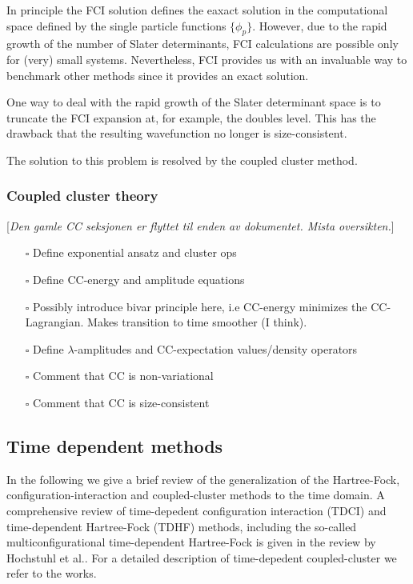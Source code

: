 \documentclass[aip,jcp,reprint,floatfix]{revtex4-1}
\newcommand \mycomment[1]   {{\color{red} [{\it {#1}}]}}
\newcommand{\todo}{$\square$}
\begin{document}
    In principle the FCI solution defines the eaxact solution in the computational space defined by the single particle functions $\{\phi_p \}$. However, due to the rapid growth of the number of Slater determinants, FCI calculations are possible only for (very) small systems. Nevertheless, FCI provides us with an invaluable way to benchmark other methods since it provides an exact solution.
    
    One way to deal with the rapid growth of the Slater determinant space is to truncate the FCI expansion at, for example, the doubles level. This has the drawback that the resulting wavefunction no longer is size-consistent\cite{shavitt2009many}.
    
    The solution to this problem is resolved by the coupled cluster method.
    
    \subsubsection{Coupled cluster theory}
    \mycomment{Den gamle CC seksjonen er flyttet til enden av dokumentet. Mista oversikten.}
    \begin{itemize}
        \item [\todo] Define exponential ansatz and cluster ops
        \item [\todo] Define CC-energy and amplitude equations
        \item [\todo] Possibly introduce bivar principle here, i.e CC-energy minimizes the CC-Lagrangian. Makes transition to time smoother (I think).
        \item [\todo] Define $\lambda$-amplitudes and CC-expectation values/density operators
        \item [\todo] Comment that CC is non-variational
        \item [\todo] Comment that CC is size-consistent
    \end{itemize}
    
    \subsection{Time dependent methods}
    
    In the following we give a brief review of the generalization of the Hartree-Fock, configuration-interaction and coupled-cluster methods to the time domain. A comprehensive review of time-depedent configuration interaction (TDCI) and time-dependent Hartree-Fock (TDHF) methods, including the so-called multiconfigurational time-dependent Hartree-Fock is given in the review by Hochstuhl et al.\cite{Hochstuhl2014}. For a detailed description of time-depedent coupled-cluster we refer to the works\cite{OATDCC_2012,Symplectic_TDCC_2018}.
    
\end{document}
